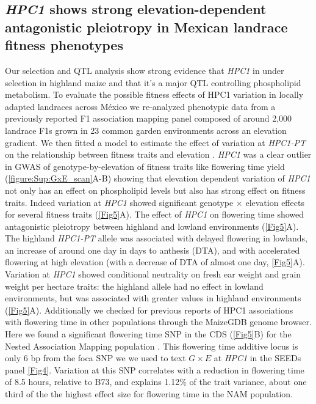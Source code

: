 \documentclass[9pt,twocolumn,twoside,lineno]{biorxiv}
\newcommand{\hpc}{\textit{HPC1}\xspace}
\begin{document}
\subsection{\hpc shows strong elevation-dependent antagonistic pleiotropy in Mexican landrace fitness phenotypes}
Our selection and QTL analysis show strong evidence that \hpc in under selection in highland maize and that it's a major QTL controlling phospholipid metabolism. 
To evaluate the possible fitness effects of HPC1 variation in locally adapted landraces across M\'exico we re-analyzed phenotypic data from a previously reported F1 association mapping panel \cite{Romero_Navarro2017-cn, Gates2019-xu} composed of around 2,000 landrace F1s grown in 23 common garden environments across an elevation gradient.  
We then fitted a model to estimate the effect of variation at \textit{HPC1-PT} on the relationship between fitness traits and elevation \cite{Runcie2019-Gr}.
\hpc was a clear outlier in GWAS of genotype-by-elevation of fitness traits like flowering time yield (\cref{figure:Sup:GxE_scan}A-B) showing that elevation dependent variation of \hpc not only has an effect on phospholipid levels but also has strong effect on fitness traits.
Indeed variation at \hpc showed significant genotype $\times$ elevation effects for several fitness traits (\cref{Fig5}A). 
The effect of \hpc on flowering time showed antagonistic pleiotropy between highland and lowland environments (\cref{Fig5}A). 
The highland \textit{HPC1-PT} allele was associated with delayed flowering in lowlands, an increase of around one day in days to anthesis (DTA), and with accelerated flowering at high elevation (with a decrease of DTA of almost one day, \cref{Fig5}A).
Variation at \hpc showed conditional neutrality on fresh ear weight and grain weight per hectare traits: the highland allele had no effect in lowland environments, but was associated with greater values in highland environments (\cref{Fig5}A).
Additionally we checked for previous reports of HPC1 associations with flowering time in other populations through the MaizeGDB \cite{Woodhouse2021-wd} genome browser. 
Here we found a significant flowering time SNP in the  CDS (\cref{Fig5}B) for the Nested Association Mapping population \cite{Wallace2014-yy}. 
This flowering time additive locus is only 6 bp from the foca SNP we we used to text  $G \times E$ at \hpc in the SEEDs panel \cref{Fig4}. 
Variation at this SNP correlates with a reduction in flowering time of 8.5 hours, relative to B73, and explains 1.12\% of the trait variance, about one third of the the highest effect size for flowering time in the NAM population. 
\end{document}

